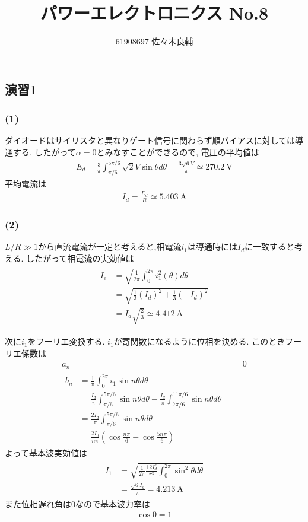 \documentclass[uplatex,a4j,11pt,dvipdfmx]{jsarticle}
\begin{document}
\title{パワーエレクトロニクス No.8}
\author{61908697 佐々木良輔}
\date{}
\maketitle
\subsection*{演習1}
\subsubsection*{(1)}
ダイオードはサイリスタと異なりゲート信号に関わらず順バイアスに対しては導通する.
したがって$\alpha=0$とみなすことができるので,
電圧の平均値は
\begin{align}
  E_d=\frac{3}{\pi}\int^{5\pi/6}_{\pi/6}\sqrt{2}V\sin\theta d\theta=\frac{3\sqrt{6}V}{\pi}\simeq 270.2\ \si{\volt}
\end{align}
平均電流は
\begin{align}
  I_d=\frac{E_d}{R}\simeq 5.403\ \si{\ampere}
\end{align}
\subsubsection*{(2)}
$L/R\gg 1$から直流電流が一定と考えると,相電流$i_1$は導通時には$I_d$に一致すると考える.
したがって相電流の実効値は
\begin{align}
  \begin{split}
    I_e&=\sqrt{\frac{1}{2\pi}\int_0^{2\pi}i_1^2(\theta)d\theta}\\
    &=\sqrt{\frac{1}{3}(I_d)^2+\frac{1}{3}(-I_d)^2}\\
    &=I_d\sqrt{\frac{2}{3}}\simeq4.412\ \si{\ampere}
  \end{split}
\end{align}

次に$i_1$をフーリエ変換する.
$i_1$が寄関数になるように位相を決める.
このときフーリエ係数は
\begin{align}
  a_n&=0\\
  \begin{split}
    b_n&=\frac{1}{\pi}\int_0^{2\pi}i_1\sin n\theta d\theta\\
    &=\frac{I_d}{\pi} \int_{\pi/6}^{5\pi/6}\sin n\theta d\theta-\frac{I_d}{\pi} \int_{7\pi/6}^{11\pi/6}\sin n\theta d\theta\\
    &=\frac{2I_d}{\pi}\int_{\pi/6}^{5\pi/6}\sin n\theta d\theta\\
    &=\frac{2I_d}{n\pi}\left(\cos\frac{n\pi}{6}-\cos\frac{5n\pi}{6}\right)
  \end{split}
\end{align}
よって基本波実効値は
\begin{align}
  \begin{split}
    I_1&=\sqrt{\frac{1}{2\pi}\frac{12I_d^2}{\pi^2}\int_0^{2\pi}\sin^2\theta d\theta}\\
    &=\frac{\sqrt{6}I_d}{\pi}=4.213\ \si{\ampere}
  \end{split}
\end{align}
また位相遅れ角は0なので基本波力率は
\begin{align}
  \cos 0=1
\end{align}
\end{document}
